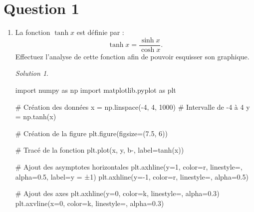 \documentclass[
  12pt,
  letterpaper,
]{book}
\newenvironment{Shaded}{}{}
\newcommand{\CommentTok}[1]{\textcolor[rgb]{0.42,0.45,0.49}{#1}}
\newcommand{\DecValTok}[1]{\textcolor[rgb]{0.00,0.36,0.77}{#1}}
\newcommand{\FloatTok}[1]{\textcolor[rgb]{0.00,0.36,0.77}{#1}}
\newcommand{\ImportTok}[1]{\textcolor[rgb]{0.01,0.18,0.38}{#1}}
\newcommand{\NormalTok}[1]{\textcolor[rgb]{0.14,0.16,0.18}{#1}}
\newcommand{\OperatorTok}[1]{\textcolor[rgb]{0.14,0.16,0.18}{#1}}
\newcommand{\StringTok}[1]{\textcolor[rgb]{0.01,0.18,0.38}{#1}}
\theoremstyle{remark}
\newtheorem*{solution}{Solution}
\begin{document}
\hypertarget{question-1-3}{%
\section{Question 1}\label{question-1-3}}

\begin{enumerate}
\def\labelenumi{\arabic{enumi}.}
\item
  La fonction \(\tanh x\) est définie par :
  \[\tanh x = \frac{\sinh x}{\cosh x}.\] Effectuez l'analyse de cette
  fonction afin de pouvoir esquisser son graphique.

  \begin{solution}

\begin{Shaded}
\begin{Highlighting}[]
\ImportTok{import}\NormalTok{ numpy }\ImportTok{as}\NormalTok{ np}
\ImportTok{import}\NormalTok{ matplotlib.pyplot }\ImportTok{as}\NormalTok{ plt}

\CommentTok{\# Création des données}
\NormalTok{x }\OperatorTok{=}\NormalTok{ np.linspace(}\OperatorTok{{-}}\DecValTok{4}\NormalTok{, }\DecValTok{4}\NormalTok{, }\DecValTok{1000}\NormalTok{)  }\CommentTok{\# Intervalle de {-}4 à 4}
\NormalTok{y }\OperatorTok{=}\NormalTok{ np.tanh(x)}

\CommentTok{\# Création de la figure}
\NormalTok{plt.figure(figsize}\OperatorTok{=}\NormalTok{(}\FloatTok{7.5}\NormalTok{, }\DecValTok{6}\NormalTok{))}

\CommentTok{\# Tracé de la fonction}
\NormalTok{plt.plot(x, y, }\StringTok{\textquotesingle{}b{-}\textquotesingle{}}\NormalTok{, label}\OperatorTok{=}\StringTok{\textquotesingle{}tanh(x)\textquotesingle{}}\NormalTok{)}

\CommentTok{\# Ajout des asymptotes horizontales}
\NormalTok{plt.axhline(y}\OperatorTok{=}\DecValTok{1}\NormalTok{, color}\OperatorTok{=}\StringTok{\textquotesingle{}r\textquotesingle{}}\NormalTok{, linestyle}\OperatorTok{=}\StringTok{\textquotesingle{}{-}{-}\textquotesingle{}}\NormalTok{, alpha}\OperatorTok{=}\FloatTok{0.5}\NormalTok{, label}\OperatorTok{=}\StringTok{\textquotesingle{}y = ±1\textquotesingle{}}\NormalTok{)}
\NormalTok{plt.axhline(y}\OperatorTok{={-}}\DecValTok{1}\NormalTok{, color}\OperatorTok{=}\StringTok{\textquotesingle{}r\textquotesingle{}}\NormalTok{, linestyle}\OperatorTok{=}\StringTok{\textquotesingle{}{-}{-}\textquotesingle{}}\NormalTok{, alpha}\OperatorTok{=}\FloatTok{0.5}\NormalTok{)}

\CommentTok{\# Ajout des axes}
\NormalTok{plt.axhline(y}\OperatorTok{=}\DecValTok{0}\NormalTok{, color}\OperatorTok{=}\StringTok{\textquotesingle{}k\textquotesingle{}}\NormalTok{, linestyle}\OperatorTok{=}\StringTok{\textquotesingle{}{-}\textquotesingle{}}\NormalTok{, alpha}\OperatorTok{=}\FloatTok{0.3}\NormalTok{)}
\NormalTok{plt.axvline(x}\OperatorTok{=}\DecValTok{0}\NormalTok{, color}\OperatorTok{=}\StringTok{\textquotesingle{}k\textquotesingle{}}\NormalTok{, linestyle}\OperatorTok{=}\StringTok{\textquotesingle{}{-}\textquotesingle{}}\NormalTok{, alpha}\OperatorTok{=}\FloatTok{0.3}\NormalTok{)}


\end{Highlighting}
\end{Shaded}
\end{solution}
\end{enumerate}
\end{document}
